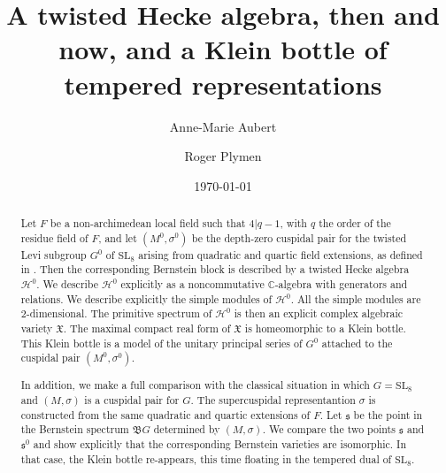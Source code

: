 \documentclass[11pt]{amsart}
\theoremstyle{remark}
\theoremstyle{definition}
\def\fB{\mathfrak{B}}
\def\fX{\mathfrak{X}}
\newcommand{\C}{\mathbb{C}}
\newcommand{\cH}{\mathcal{H}}
\newcommand{\SL}{\mathrm{SL}}
\newcommand{\fs}{\mathfrak{s}}
\def\fB{\mathfrak{B}}
\begin{document}
\title[Klein bottle]{A twisted Hecke algebra, then and now, and a Klein bottle of tempered representations}



\begin{abstract} Let $F$ be a non-archimedean local field such that $4|q-1$, with $q$ the order of the residue field of $F$, and let $(M^0,\sigma^0)$ be the depth-zero
cuspidal pair for the  twisted Levi subgroup $G^0$ of $\SL_8$ arising from quadratic and quartic field extensions, as defined in \cite{AFO}.   
Then the corresponding Bernstein block is described by a twisted Hecke algebra $\cH^0$.   We describe $\cH^0$ explicitly as a noncommutative $\C$-algebra with generators and relations.   
We describe explicitly the simple modules of $\cH^0$.   All the simple modules are $2$-dimensional.   The  primitive spectrum of $\cH^0$ is then an explicit  complex algebraic variety $\fX$.
 The maximal compact real form of $\fX$ is homeomorphic to a Klein bottle. This Klein bottle is a model of the unitary principal series of $G^0$ attached  to the cuspidal pair $(M^0, \sigma^0)$.  
 
In addition, we make a full comparison with the classical situation in which 
$G = \SL_8$ and $(M,\sigma)$ is a cuspidal pair for $G$.   The supercuspidal representantion $\sigma$ is constructed from the same quadratic and quartic extensions of $F$.   Let $\fs$ be the point in the Bernstein spectrum $\fB G$ determined by $(M,\sigma)$.  
We compare the two points $\fs$ and $\fs^0$ and show explicitly that the corresponding Bernstein varieties 
  are isomorphic.   In that case, the Klein bottle re-appears, this time floating in the tempered dual of $\SL_8$.   
 \end{abstract}




\author[A.-M. Aubert]{Anne-Marie Aubert}
\address{Sorbonne Universit\'e and Universit\'e Paris Cit\'e, CNRS, IMJ-PRG, F-75005 Paris, France}
\author[R. Plymen]{Roger Plymen}\address{
School of Mathematics, Southampton University, Southampton SO17 1BJ,  England 
\emph{and} School of Mathematics, Manchester University, Manchester M13 9PL, England}


\date{\today}
\maketitle
\end{document}
